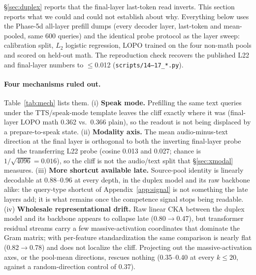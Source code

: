 \S\ref{sec:duplex} reports that the final-layer last-token read
inverts. This section reports what we could and could not establish
about why. Everything below uses the Phase-5d all-layer prefill
dumps (every decoder layer, last-token and mean-pooled, same 600
queries) and the identical probe protocol as the layer sweep:
calibration split, $L_2$ logistic regression, LOPO trained on the four
non-math pools and scored on held-out math. The reproduction check
recovers the published L22 and final-layer numbers to $\le$0.012
(\texttt{scripts/14--17\_*.py}).

\paragraph{Four mechanisms ruled out.} Table~\ref{tab:mech} lists them.
(i) \textbf{Speak mode.} Prefilling the same text queries under the
TTS/speak-mode template leaves the cliff exactly where it was
(final-layer LOPO math 0.362 vs.\ 0.366 plain), so the readout is not
being displaced by a prepare-to-speak state. (ii) \textbf{Modality axis.}
The mean audio-minus-text direction at the final layer is orthogonal
to both the inverting final-layer probe and the transferring L22 probe
(cosine 0.013 and 0.027; chance is $1/\sqrt{4096}=0.016$), so the
cliff is not the audio/text split that \S\ref{sec:xmodal} measures.
(iii) \textbf{More shortcut available late.} Source-pool identity is
linearly decodable at 0.88--0.96 at every depth, in the duplex
model and its raw backbone alike: the query-type shortcut of
Appendix~\ref{app:signal} is not something the late layers add; it is
what remains once the competence signal stops being readable.
(iv) \textbf{Wholesale representational drift.} Raw linear CKA between
the duplex model and its backbone appears to collapse late
(0.80$\to$0.47), but transformer residual streams carry a few
massive-activation coordinates that dominate the Gram matrix; with
per-feature standardization the same comparison is nearly flat
(0.82$\to$0.78) and does not localize the cliff. Projecting out the
massive-activation axes, or the pool-mean directions, rescues nothing
(0.35--0.40 at every $k\le20$, against a random-direction control of
0.37).

